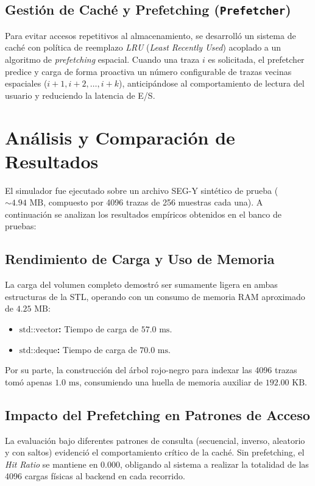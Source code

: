 \documentclass[11pt, a4paper]{article}
\begin{document}
\subsection{Gestión de Caché y Prefetching (\texttt{Prefetcher})}
Para evitar accesos repetitivos al almacenamiento, se desarrolló un sistema de caché con política de reemplazo \textit{LRU} (\textit{Least Recently Used}) acoplado a un algoritmo de \textit{prefetching} espacial. Cuando una traza $i$ es solicitada, el prefetcher predice y carga de forma proactiva un número configurable de trazas vecinas espaciales ($i+1, i+2, \dots, i+k$), anticipándose al comportamiento de lectura del usuario y reduciendo la latencia de E/S.

\section{Análisis y Comparación de Resultados}
El simulador fue ejecutado sobre un archivo SEG-Y sintético de prueba ($\sim 4.94\text{ MB}$, compuesto por 4096 trazas de 256 muestras cada una). A continuación se analizan los resultados empíricos obtenidos en el banco de pruebas:

\subsection{Rendimiento de Carga y Uso de Memoria}
La carga del volumen completo demostró ser sumamente ligera en ambas estructuras de la STL, operando con un consumo de memoria RAM aproximado de $4.25\text{ MB}$:
\begin{itemize}
    \item \textbf{$\text{std::vector}$:}{ Tiempo de carga de $57.0\text{ ms}$.}
    \item \textbf{$\text{std::deque}$:}{ Tiempo de carga de $70.0\text{ ms}$.}
\end{itemize}
Por su parte, la construcción del árbol rojo-negro para indexar las 4096 trazas tomó apenas $1.0\text{ ms}$, consumiendo una huella de memoria auxiliar de $192.00\text{ KB}$.

\subsection{Impacto del Prefetching en Patrones de Acceso}
La evaluación bajo diferentes patrones de consulta (secuencial, inverso, aleatorio y con saltos) evidenció el comportamiento crítico de la caché. Sin prefetching, el \textit{Hit Ratio} se mantiene en $0.000$, obligando al sistema a realizar la totalidad de las 4096 cargas físicas al backend en cada recorrido.
\end{document}
